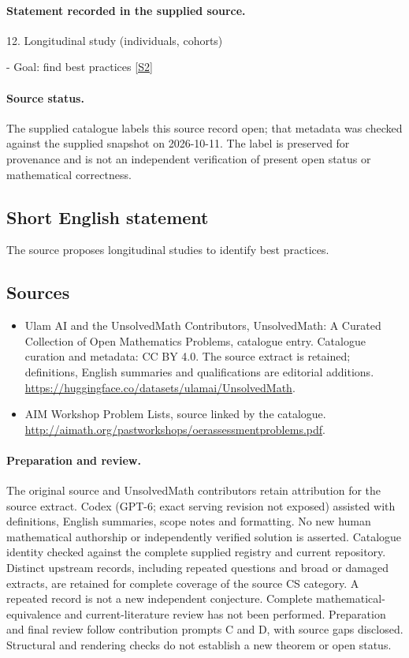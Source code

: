 \documentclass[11pt]{article}
\begin{document}
\paragraph{Statement recorded in the supplied source.}
12. Longitudinal study (individuals, cohorts)

- Goal: find best practices \href{http://aimath.org/pastworkshops/oerassessmentproblems.pdf}{[S2]}
\paragraph{Source status.}
The supplied catalogue labels this source record open; that metadata was checked against the supplied snapshot on 2026-10-11. The label is preserved for provenance and is not an independent verification of present open status or mathematical correctness.
\subsection{Short English statement}
The source proposes longitudinal studies to identify best practices.
\subsection{Sources}
\begin{itemize}
\item[S1] Ulam AI and the UnsolvedMath Contributors, UnsolvedMath: A Curated Collection of Open Mathematics Problems, catalogue entry. Catalogue curation and metadata: CC BY 4.0. The source extract is retained; definitions, English summaries and qualifications are editorial additions.
\url{https://huggingface.co/datasets/ulamai/UnsolvedMath}.
\item[S2] AIM Workshop Problem Lists, source linked by the catalogue.
\url{http://aimath.org/pastworkshops/oerassessmentproblems.pdf}.
\end{itemize}
\paragraph{Preparation and review.}
The original source and UnsolvedMath contributors retain attribution for the source extract. Codex (GPT-6; exact serving revision not exposed) assisted with definitions, English summaries, scope notes and formatting. No new human mathematical authorship or independently verified solution is asserted. Catalogue identity checked against the complete supplied registry and current repository. Distinct upstream records, including repeated questions and broad or damaged extracts, are retained for complete coverage of the source CS category. A repeated record is not a new independent conjecture. Complete mathematical-equivalence and current-literature review has not been performed. Preparation and final review follow contribution prompts C and D, with source gaps disclosed. Structural and rendering checks do not establish a new theorem or open status.
\label{end:statement}
\end{document}
